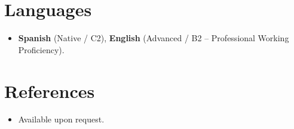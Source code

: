 \documentclass[11pt,a4paper,sans]{moderncv}
\begin{document}

\section{Languages}
\vspace{1pt}
\begin{itemize}
\item {\textbf{Spanish} (Native / C2), \textbf{English} (Advanced / B2 -- Professional Working Proficiency).}
\end{itemize}


\section{References}
\vspace{1pt}
\begin{itemize}
\item{Available upon request.}
\end{itemize}
\end{document}
